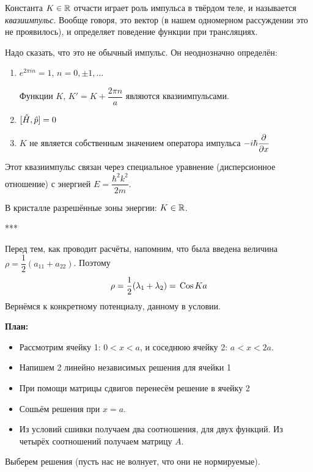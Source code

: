 \Rem Константа $K \in \mathbb {R}$ отчасти играет роль импульса в твёрдом теле, и называется \emph{квазиимпульс}.
Вообще говоря, это вектор (в нашем одномерном рассуждении это не проявилось), и определяет поведение функции при трансляциях.

Надо сказать, что это не обычный импульс. Он неоднозначно определён:
\begin{enumerate}
  \item $e^{2\pi i n} = 1$, $n = 0, \pm 1, \ldots$

  Функции $K$, $K' = K + \dfrac{2\pi n}{a}$ являются квазиимпульсами.
  \item $[\Hat H, \Hat p] = 0$
  \item $K$ не является собственным значением оператора импульса $-i \hbar \dfrac{\partial }{\partial x}$
\end{enumerate}
Этот квазиимпульс связан через специальное уравнение (дисперсионное отношение) с энергией $E = \dfrac{\hbar^2 k^2}{2m}$.

В кристалле разрешённые зоны энергии: $K \in \mathbb {R}$.

***

Перед тем, как проводит расчёты, напомним, что была введена величина $\rho = \dfrac12 (a_{11} + a_{22})$.
Поэтому
$$
    \rho = \dfrac12 (\lambda_1 + \lambda_2) = \,\mathrm {Cos} \,  Ka
$$
Вернёмся к конкретному потенциалу, данному в условии.

\textbf{План:}
\begin{itemize}
  \item Рассмотрим ячейку 1: $0 < x < a$, и соседнюю ячейку 2: $a < x < 2a$.
  \item Напишем 2 линейно независимых решения для ячейки 1
  \item При помощи матрицы сдвигов перенесём решение в ячейку 2
  \item Сошьём решения при $x = a$.
  \item Из условий сшивки получаем два соотношения, для двух функций. Из четырёх соотношений получаем матрицу $A$.
\end{itemize}
Выберем решения (пусть нас не волнует, что они не нормируемые).

